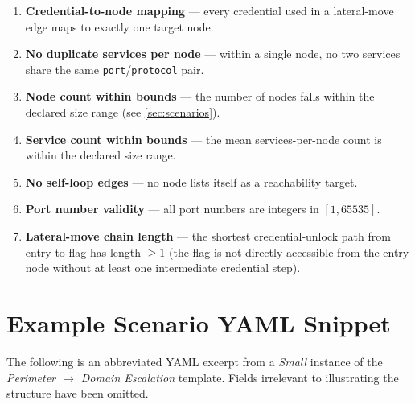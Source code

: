 \documentclass[11pt,a4paper]{article}
\begin{document}
\begin{enumerate}
          credential that exists.
    \item \textbf{Credential-to-node mapping} — every credential used in a
          lateral-move edge maps to exactly one target node.
    \item \textbf{No duplicate services per node} — within a single node, no
          two services share the same \texttt{port}/\texttt{protocol} pair.
    \item \textbf{Node count within bounds} — the number of nodes falls within
          the declared size range (see \cref{sec:scenarios}).
    \item \textbf{Service count within bounds} — the mean services-per-node
          count is within the declared size range.
    \item \textbf{No self-loop edges} — no node lists itself as a reachability
          target.
    \item \textbf{Port number validity} — all port numbers are integers in
          $[1, 65535]$.
    \item \textbf{Lateral-move chain length} — the shortest credential-unlock
          path from entry to flag has length $\geq 1$ (the flag is not
          directly accessible from the entry node without at least one
          intermediate credential step).
\end{enumerate}

\section{Example Scenario YAML Snippet}
\label{app:yaml}

The following is an abbreviated YAML excerpt from a \emph{Small} instance of
the \emph{Perimeter $\to$ Domain Escalation} template.  Fields irrelevant to
illustrating the structure have been omitted.
\end{document}
